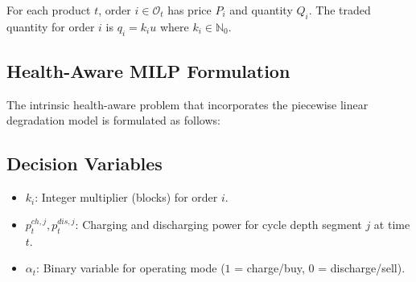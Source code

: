 \documentclass[10pt,twocolumn]{article}
\begin{document}
For each product $t$, order $i \in \mathcal{O}_t$ has price $P_i$ and quantity $Q_i$. The traded quantity for order $i$ is $q_i = k_i u$ where $k_i \in \mathbb{N}_0$.


\subsection{Health-Aware MILP Formulation}

The intrinsic health-aware problem that incorporates the piecewise linear degradation model is formulated as follows:
\subsection*{Decision Variables}
\begin{itemize}
    \item $k_i$: Integer multiplier (blocks) for order $i$.
    \item $p_t^{ch,j}, p_t^{dis,j}$: Charging and discharging power for cycle depth segment $j$ at time $t$.
    \item $\alpha_t$: Binary variable for operating mode ($1$ = charge/buy, $0$ = discharge/sell).
\end{itemize}
\end{document}
